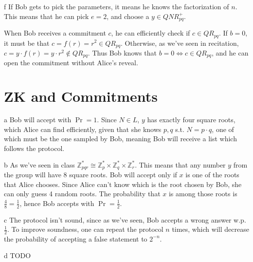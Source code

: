 \documentclass{article}
\begin{document}
\begin{paragraph}
    f If Bob gets to pick the parameters, it means he knows the factorization of \(n\). This means that he can pick \(e = 2\), and choose a \(y \in QNR^+_{pq}\).
    
    When Bob receives a commitment \(c\), he can efficiently check if \(c \in QR_{pq}\). If \(b = 0\), it must be that \(c = f(r) = r^2 \in QR_{pq}\). Otherwise, as we've seen in recitation, \(c = y \cdot f(r) = y \cdot r^2 \not\in QR_{pq}\). Thus Bob knows that \(b = 0 \iff c \in QR_{pq}\), and he can open the commitment without Alice's reveal.
\end{paragraph}

\section{ZK and Commitments}
\begin{paragraph}
    a Bob will accept with $\Pr = 1$. Since $N \in L$, $y$ has exactly four square roots, which
    Alice can find efficiently, given that she knows $p,q$ s.t. $N = p\cdot q$, one
    of which must be the one sampled by Bob, meaning Bob will receive a list which follows
    the protocol.
\end{paragraph}

\begin{paragraph}
    b As we've seen in class $\mathbb{Z}^*_{pqr} \cong \mathbb{Z}^*_p \times \mathbb{Z}^*_q \times \mathbb{Z}^*_r$.
    This means that any number $y$ from the group will have 8 square roots.
    Bob will accept only if $x$ is one of the roots that Alice chooses. Since Alice can't
    know which is the root chosen by Bob, she can only guess 4 random roots.
    The probability that $x$ is among those roots is $\frac{4}{8} = \frac{1}{2}$, hence
    Bob accepts with $\Pr = \frac{1}{2}$.
\end{paragraph}

\begin{paragraph}
    c The protocol isn't sound, since as we've seen, Bob accepts a wrong answer w.p. $\frac{1}{2}$.
    To improve soundness, one can repeat the protocol $n$ times, which will decrease the probability
    of accepting a false statement to $2^{-n}$.
\end{paragraph}

\begin{paragraph}
    d TODO
\end{paragraph}
\end{document}
